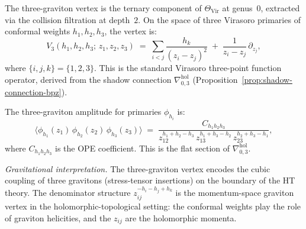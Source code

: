 \begin{computation}
\label{comp:thqg-V-three-graviton}
The three-graviton vertex is the ternary component of
$\Theta_{\mathrm{Vir}}$ at genus~$0$, extracted via the collision
filtration at depth~$2$. On the space of three Virasoro
primaries of conformal weights $h_1, h_2, h_3$, the vertex is:
\begin{equation}\label{eq:thqg-V-three-graviton}
V_3(h_1, h_2, h_3;\, z_1, z_2, z_3)
\;=\;
\sum_{i<j}
\frac{h_k}{(z_i - z_j)^2}
\;+\;
\frac{1}{z_i - z_j}\,\partial_{z_j},
\end{equation}
where $\{i,j,k\} = \{1,2,3\}$. This is the standard Virasoro
three-point function operator, derived from the shadow connection
$\nabla^{\mathrm{hol}}_{0,3}$
(Proposition~\ref{prop:shadow-connection-bpz}).

The three-graviton amplitude for primaries $\phi_{h_i}$ is:
\begin{equation}\label{eq:thqg-V-three-graviton-amplitude}
\langle \phi_{h_1}(z_1)\,\phi_{h_2}(z_2)\,\phi_{h_3}(z_3) \rangle
\;=\;
\frac{C_{h_1 h_2 h_3}}
{z_{12}^{h_1+h_2-h_3}\,z_{13}^{h_1+h_3-h_2}\,z_{23}^{h_2+h_3-h_1}},
\end{equation}
where $C_{h_1 h_2 h_3}$ is the OPE coefficient. This is the flat
section of $\nabla^{\mathrm{hol}}_{0,3}$.

\emph{Gravitational interpretation.}
The three-graviton vertex encodes the cubic coupling of three
gravitons (stress-tensor insertions) on the boundary of the HT
theory. The denominator structure $z_{ij}^{-h_i - h_j + h_k}$ is
the momentum-space graviton vertex in the holomorphic-topological
setting: the conformal weights play the role of graviton helicities,
and the $z_{ij}$ are the holomorphic momenta.
\end{computation}

